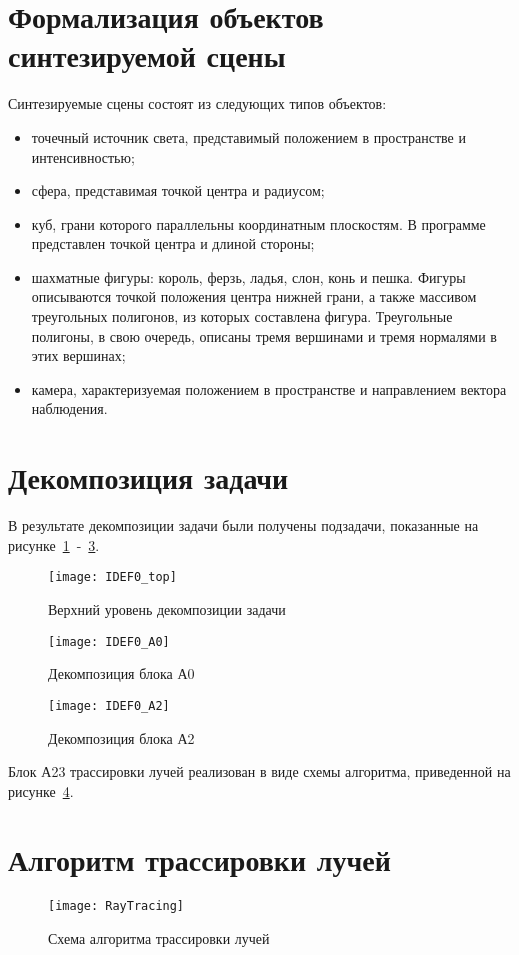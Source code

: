 \section{Формализация объектов синтезируемой сцены}
Синтезируемые сцены состоят из следующих типов объектов:
\begin{itemize}
	\item точечный источник света, представимый положением в пространстве и интенсивностью;
	\item сфера, представимая точкой центра и радиусом;
	\item куб, грани которого параллельны координатным плоскостям. В программе представлен точкой центра и длиной стороны;
	\item шахматные фигуры: король, ферзь, ладья, слон, конь и пешка. Фигуры описываются точкой положения центра нижней грани, а также массивом треугольных полигонов, из которых составлена фигура. Треугольные полигоны, в свою очередь, описаны тремя вершинами и тремя нормалями в этих вершинах;
	\item камера, характеризуемая положением в пространстве и направлением вектора наблюдения.
\end{itemize}


\section{Декомпозиция задачи}
В результате декомпозиции задачи были получены подзадачи, показанные на рисунке~\ref{fig:IDEF0_top}~-~\ref{fig:IDEF0_2}.

\begin{figure}[H]
	\centering
	\texttt{[image: IDEF0\_top]}
	\caption{Верхний уровень декомпозиции задачи}
	\label{fig:IDEF0_top}
\end{figure}

\begin{figure}[H]
	\centering
	\texttt{[image: IDEF0\_A0]}
	\caption{Декомпозиция блока А0}
	\label{fig:IDEF0_1}
\end{figure}

\begin{figure}[H]
	\centering
	\texttt{[image: IDEF0\_A2]}
	\caption{Декомпозиция блока А2}
	\label{fig:IDEF0_2}
\end{figure}

Блок А23 трассировки лучей реализован в виде схемы алгоритма, приведенной на рисунке~\ref{fig:RayTracing}.


\section{Алгоритм трассировки лучей}
\begin{figure}[H]
	\centering
	\texttt{[image: RayTracing]}
	\caption{Схема алгоритма трассировки лучей}
	\label{fig:RayTracing}
\end{figure}

